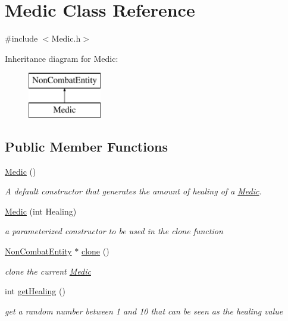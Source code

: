 \hypertarget{class_medic}{}\section{Medic Class Reference}
\label{class_medic}


{\ttfamily \#include $<$Medic.\+h$>$}

Inheritance diagram for Medic\+:\begin{figure}[H]
\begin{center}
\leavevmode
\includegraphics[height=2.000000cm]{class_medic}
\end{center}
\end{figure}
\subsection*{Public Member Functions}
\begin{DoxyCompactItemize}
\item 
\mbox{\hyperlink{class_medic_a6bd1946f4e44fe417380daf53d70eb17}{Medic}} ()
\begin{DoxyCompactList}\small\item\em A default constructor that generates the amount of healing of a \mbox{\hyperlink{class_medic}{Medic}}. \end{DoxyCompactList}\item 
\mbox{\hyperlink{class_medic_a75c6387c59af4a70cccad2f449b1fb21}{Medic}} (int Healing)
\begin{DoxyCompactList}\small\item\em a parameterized constructor to be used in the clone function \end{DoxyCompactList}\item 
\mbox{\hyperlink{class_non_combat_entity}{Non\+Combat\+Entity}} $\ast$ \mbox{\hyperlink{class_medic_a973bcb165d5cb3d3b4f522496234f690}{clone}} ()
\begin{DoxyCompactList}\small\item\em clone the current \mbox{\hyperlink{class_medic}{Medic}} \end{DoxyCompactList}\item 
int \mbox{\hyperlink{class_medic_a9fb060ee25f974cc27d0786ca6c43ddf}{get\+Healing}} ()
\begin{DoxyCompactList}\small\item\em get a random number between 1 and 10 that can be seen as the healing value \end{DoxyCompactList}\end{DoxyCompactItemize}


